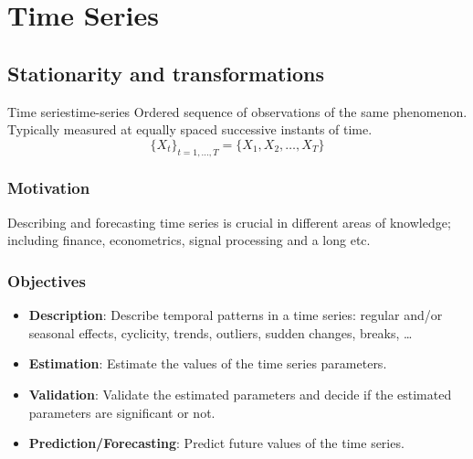\chapter{Time Series}
\section{Stationarity and transformations}

\begin{definition}{Time series}{time-series}
	Ordered sequence of observations of the same phenomenon. Typically
	measured at equally spaced successive instants of time.
	\begin{equation*}
		\{X_t\}_{t=1,\ldots,T} = \{X_1, X_2, \ldots, X_T\}
	\end{equation*}
\end{definition}

\subsection{Motivation}

Describing and forecasting time series is crucial in different areas of
knowledge; including finance, econometrics, signal processing and a long etc.

\subsection{Objectives}

\begin{itemize}
	\item \textbf{Description}: Describe temporal patterns in a time series: regular and/or
	      seasonal effects, cyclicity, trends, outliers, sudden changes, breaks, \dots
	\item \textbf{Estimation}: Estimate the values of the time series parameters.
	\item \textbf{Validation}: Validate the estimated parameters and decide if the estimated
	      parameters are significant or not.
	\item \textbf{Prediction/Forecasting}: Predict future values of the time series.
\end{itemize}

